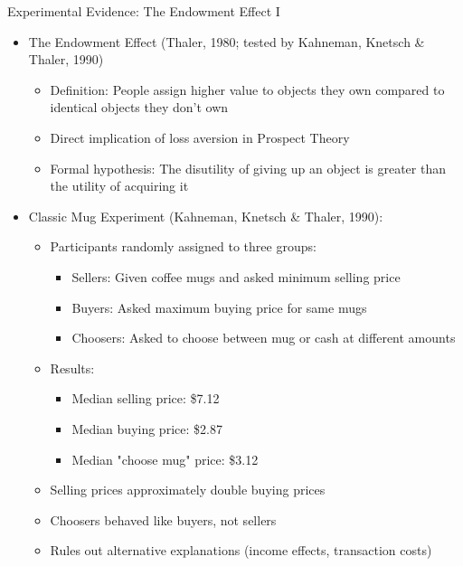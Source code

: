 \documentclass[10pt]{beamer}
\begin{document}
\begin{frame}{Experimental Evidence: The Endowment Effect I}
  \begin{itemize}[<+->]
    \item The Endowment Effect (Thaler, 1980; tested by Kahneman, Knetsch \& Thaler, 1990)
      \begin{itemize}
        \item Definition: People assign higher value to objects they own compared to identical objects they don't own
        \item Direct implication of loss aversion in Prospect Theory
        \item Formal hypothesis: The disutility of giving up an object is greater than the utility of acquiring it
      \end{itemize}
    \item Classic Mug Experiment (Kahneman, Knetsch \& Thaler, 1990):
      \begin{itemize}
        \item Participants randomly assigned to three groups:
          \begin{itemize}
            \item Sellers: Given coffee mugs and asked minimum selling price
            \item Buyers: Asked maximum buying price for same mugs
            \item Choosers: Asked to choose between mug or cash at different amounts
          \end{itemize}
        \item Results:
          \begin{itemize}
            \item Median selling price: \$7.12
            \item Median buying price: \$2.87
            \item Median "choose mug" price: \$3.12
          \end{itemize}
        \item Selling prices approximately double buying prices
        \item Choosers behaved like buyers, not sellers
        \item Rules out alternative explanations (income effects, transaction costs)
      \end{itemize}
  \end{itemize}
\end{frame}
\end{document}

